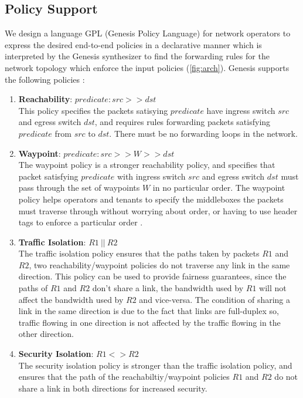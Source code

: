 \documentclass[]{sig}
\begin{document}
\subsection{Policy Support} \label{sec:policy}
We design a language GPL (Genesis Policy Language) for network operators to express the desired end-to-end policies in a declarative manner which is interpreted by the Genesis synthesizer to find the forwarding rules for the network topology which enforce the input policies (\cref{fig:arch}). Genesis supports the following policies : 
\begin{enumerate} 
	\item \textbf{Reachability}: $predicate : src >> dst$ \\
	This policy specifies the packets satisying $predicate$ have ingress switch $src$ and egress switch $dst$, and requires rules forwarding packets satisfying $predicate$ from $src$ to $dst$. There must be no forwarding loops in the network. 
	\item \textbf{Waypoint}: $predicate : src >> W >> dst$ \\
	The waypoint policy is a stronger reachability policy, and specifies that packet satisfying $predicate$ with ingress switch $src$ and egress switch $dst$ must pass through the set of waypoints $W$ in no particular order. The waypoint policy helps operators and tenants to specify the middleboxes the packets must traverse through without worrying about order, or having to use header tags to enforce a particular order \cite{flowtags}. 
	\item \textbf{Traffic Isolation}:  $R1 \ || \ R2$ \\
	The traffic isolation policy ensures that the paths taken by packets $R1$ and $R2$, two reachability/waypoint policies do not traverse any link in the same direction. This policy can be used to provide fairness guarantees, since the paths of $R1$ and $R2$ don't share a link, the bandwidth used by $R1$ will not affect the bandwidth used by $R2$ and vice-versa. The condition of sharing a link in the same direction is due to the fact that links are full-duplex so, traffic flowing in one direction is not affected by the traffic flowing in the other direction.
	\item \textbf{Security Isolation}: $R1 <> R2$ \\
	The security isolation policy is stronger than the traffic isolation policy, and ensures that the path of the reachabiltiy/waypoint policies $R1$ and $R2$ do not share a link in both directions for increased security.

\end{enumerate}
\end{document}
